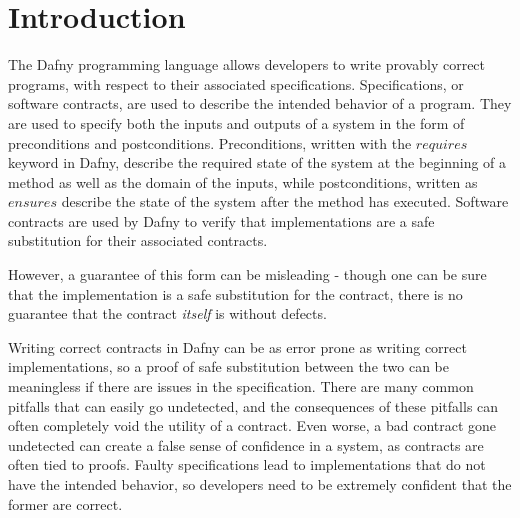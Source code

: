 \documentclass[sigplan,screen,anonymous]{acmart}
\begin{document}



\maketitle

\section{Introduction}

The Dafny programming language \cite{leino2010dafny} allows developers to write provably correct programs, with respect to their associated specifications. Specifications, or software contracts, are used to describe the intended behavior of a program. They are used to specify both the inputs and outputs of a system in the form of preconditions and postconditions. Preconditions, written with the \(requires\) keyword in Dafny, describe the required state of the system at the beginning of a method as well as the domain of the inputs, while postconditions, written as \(ensures\) describe the state of the system after the method has executed. Software contracts are used by Dafny to verify that implementations are a safe substitution \cite{liskov1987keynote} for their associated contracts.

However, a guarantee of this form can be misleading - though one can be sure that the implementation is a safe substitution for the contract, there is no guarantee that the contract \emph{itself} is without defects.

Writing correct contracts in Dafny can be as error prone as writing correct implementations, so a proof of safe substitution between the two can be meaningless if there are issues in the specification. There are many common pitfalls that can easily go undetected, and the consequences of these pitfalls can often completely void the utility of a contract. Even worse, a bad contract gone undetected can create a false sense of confidence in a system, as contracts are often tied to proofs. Faulty specifications lead to implementations that do not have the intended behavior, so developers need to be extremely confident that the former are correct.
\end{document}
